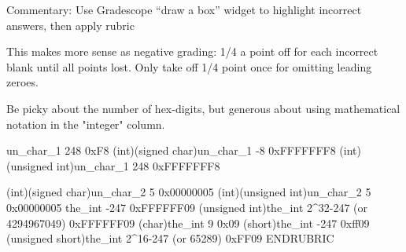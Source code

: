 Commentary:
Use Gradescope ``draw a box'' widget to highlight incorrect answers,
then apply rubric

This makes more sense as negative grading: 1/4 a point off for each
incorrect blank until all points lost. Only take off 1/4 point once
for omitting leading zeroes.

Be picky about the number of hex-digits, but generous about using
mathematical notation in the "integer" column.

un_char_1                        248     0xF8
(int)(signed char)un_char_1      -8      0xFFFFFFF8
(int)(unsigned int)un_char_1     248     0xFFFFFFF8

(int)(signed char)un_char_2      5       0x00000005
(int)(unsigned int)un_char_2     5       0x00000005
the_int                          -247    0xFFFFFF09
(unsigned int)the_int            2^32-247 (or 4294967049) 0xFFFFFF09
(char)the_int                    9       0x09
(short)the_int                   -247    0xff09
(unsigned short)the_int          2^16-247 (or 65289)      0xFF09
ENDRUBRIC
